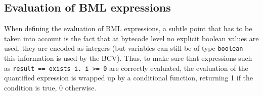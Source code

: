 	


\subsection{Evaluation of BML expressions}

When defining the evaluation of BML expressions, a subtle point that
has to be taken into account is the fact that at bytecode level no
explicit boolean values are used, they are encoded as integers (but
variables can still be of type \texttt{boolean} --- this information is
used by the BCV). Thus, to make sure that expressions such as
\texttt{\bsl result == \bsl exists i. i >= 0} are correctly evaluated,
the evaluation of the quantified expression is wrapped up by a
conditional function, returning 1 if the condition is true, 0
otherwise.


